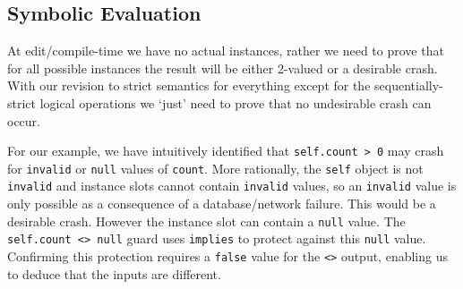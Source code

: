 \documentclass[
]{ceurart}
\begin{document}
\subsection{Symbolic Evaluation}\label{Symbolic Evaluation}



At edit/compile-time we have no actual instances, rather we need to prove that for all possible instances the result will be either 2-valued or a desirable crash. With our revision to strict semantics for everything except for the sequentially-strict logical operations we `just' need to prove that no undesirable crash can occur.

For our example, we have intuitively identified that \verb|self.count > 0| may crash for \verb|invalid| or \verb|null| values of \verb|count|. More rationally, the \verb|self| object is not \verb|invalid| and instance slots cannot contain \verb|invalid| values, so an \verb|invalid| value is only possible as a consequence of a database/network failure. This would be a desirable crash. However the instance slot can contain a \verb|null| value. The \verb|self.count <> null| guard uses \verb|implies| to protect against this \verb|null| value. Confirming this protection requires a \verb|false| value for the \verb|<>| output, enabling us to deduce that the inputs are different.
\end{document}
